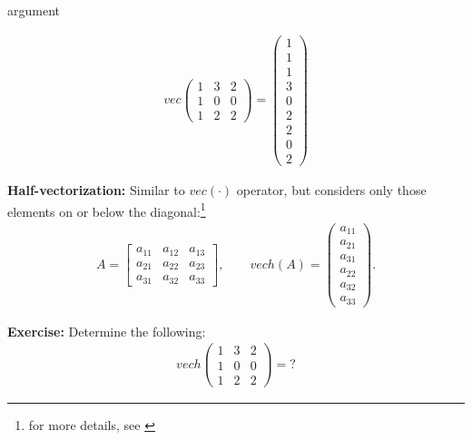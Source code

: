 \begin{labeling}{argument}
    \begin{sol}
        \begin{align*}
            vec \begin{pmatrix}
                    1 & 3 & 2 \\
                    1 & 0 & 0 \\
                    1 & 2 & 2
                \end{pmatrix}
            =
            \begin{pmatrix}
                1 \\ 1 \\ 1 \\ 3 \\ 0 \\ 2 \\ 2 \\ 0 \\ 2
            \end{pmatrix}
        \end{align*}
    \end{sol}

    \item[\textbf{Half-vectorization:}] Similar to $vec(\cdot)$ operator, but considers only those elements on or below the diagonal:\footnote{for more details, see \cite[][page 300-301]{Hamilton-1994}}
    \begin{align*}
        A
        = \begin{bmatrix}
              a_{11} & a_{12} & a_{13} \\
              a_{21} & a_{22} & a_{23} \\
              a_{31} & a_{32} & a_{33}
          \end{bmatrix},
        \quad \quad
        vech(A)
        = \begin{pmatrix}
              a_{11} \\ a_{21} \\ a_{31} \\ a_{22} \\ a_{32} \\ a_{33}
          \end{pmatrix}.
    \end{align*}

    \textbf{Exercise:} Determine the following:
    \begin{align*}
        vech \begin{pmatrix}
                 1 & 3 & 2 \\
                 1 & 0 & 0 \\
                 1 & 2 & 2
             \end{pmatrix}
        =
        ?
    \end{align*}


\end{labeling}
